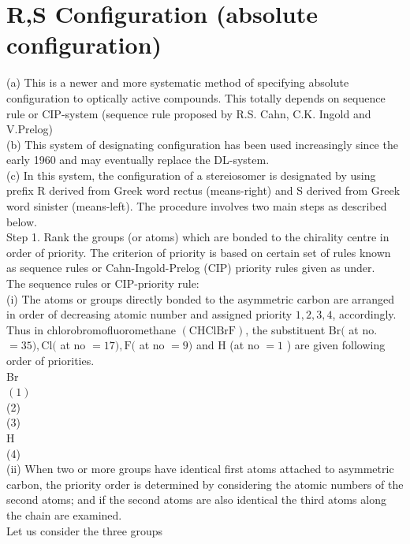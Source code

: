 \documentclass[10pt]{article}
\begin{document}
\section*{R,S Configuration (absolute configuration)}
(a) This is a newer and more systematic method of specifying absolute configuration to optically active compounds. This totally depends on sequence rule or CIP-system (sequence rule proposed by R.S. Cahn, C.K. Ingold and V.Prelog)\\
(b) This system of designating configuration has been used increasingly since the early 1960 and may eventually replace the DL-system.\\
(c) In this system, the configuration of a stereiosomer is designated by using prefix R derived from Greek word rectus (means-right) and S derived from Greek word sinister (means-left). The procedure involves two main steps as described below.\\
Step 1. Rank the groups (or atoms) which are bonded to the chirality centre in order of priority. The criterion of priority is based on certain set of rules known as sequence rules or Cahn-Ingold-Prelog (CIP) priority rules given as under.\\
The sequence rules or CIP-priority rule:\\
(i) The atoms or groups directly bonded to the asymmetric carbon are arranged in order of decreasing atomic number and assigned priority $1,2,3,4$, accordingly.\\
Thus in chlorobromofluoromethane $(\mathrm{CHClBrF})$, the substituent $\mathrm{Br}($ at no. $=35), \mathrm{Cl}($ at no $=17), \mathrm{F}($ at no $=9)$ and H (at no $=1$ ) are given following order of priorities.\\
Br\\
$(1)$\\
(2)\\
(3)\\
H\\
(4)\\
(ii) When two or more groups have identical first atoms attached to asymmetric carbon, the priority order is determined by considering the atomic numbers of the second atoms; and if the second atoms are also identical the third atoms along the chain are examined.\\
Let us consider the three groups
\end{document}
